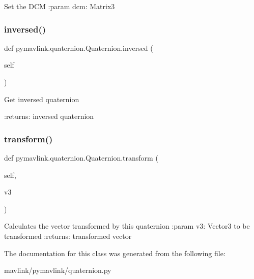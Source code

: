 \begin{DoxyVerb}Set the DCM
:param dcm: Matrix3\end{DoxyVerb}
 \mbox{\label{classpymavlink_1_1quaternion_1_1Quaternion_a0dd030159c7d726fad2cb12fd4c3983a}} 
\subsubsection{\texorpdfstring{inversed()}{inversed()}}
{\footnotesize\ttfamily def pymavlink.\+quaternion.\+Quaternion.\+inversed (\begin{DoxyParamCaption}\item[{}]{self }\end{DoxyParamCaption})}

\begin{DoxyVerb}Get inversed quaternion

:returns: inversed quaternion
\end{DoxyVerb}
 \mbox{\label{classpymavlink_1_1quaternion_1_1Quaternion_a79b86f00f3500a6c34fa3a099f3714f7}} 
\subsubsection{\texorpdfstring{transform()}{transform()}}
{\footnotesize\ttfamily def pymavlink.\+quaternion.\+Quaternion.\+transform (\begin{DoxyParamCaption}\item[{}]{self,  }\item[{}]{v3 }\end{DoxyParamCaption})}

\begin{DoxyVerb}Calculates the vector transformed by this quaternion
:param v3: Vector3 to be transformed
:returns: transformed vector
\end{DoxyVerb}
 

The documentation for this class was generated from the following file\+:\begin{DoxyCompactItemize}
\item 
mavlink/pymavlink/quaternion.\+py\end{DoxyCompactItemize}
